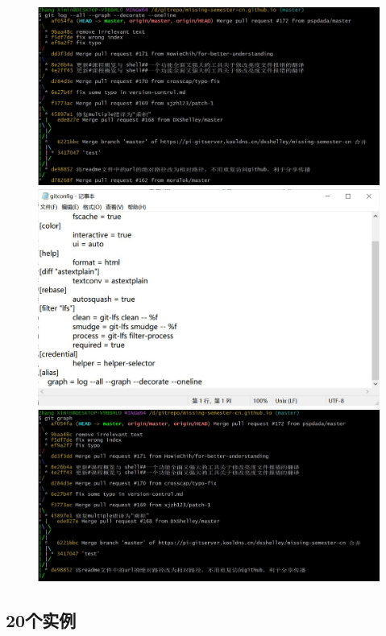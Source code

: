\documentclass[a4paper, 12pt]{article}
\begin{document}
	\begin{figure}[H]
		\centering
		\includegraphics[width=1\textwidth]{012.jpg}
		\includegraphics[width=1\textwidth]{013.jpg}
		\includegraphics[width=1\textwidth]{014.jpg}
	\end{figure}
	
	\subsection{20个实例}
	
\end{document}
